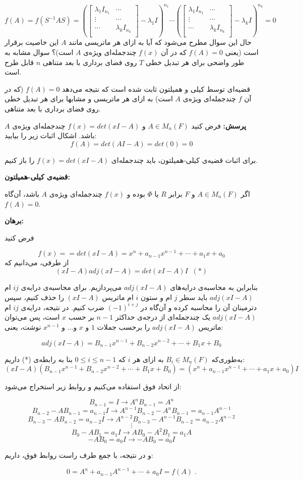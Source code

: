 $$f(A)=f(S^{-1}AS)=(\begin{bmatrix}
\lambda_1 I_{n_1} & \cdots \\
\vdots & \cdots \\
\cdots & \lambda_k I_{n_k}\\
\end{bmatrix}-\lambda_1 I)^{n_1} \cdots (\begin{bmatrix}
\lambda_1 I_{n_1} & \cdots \\
\vdots & \cdots \\
\cdots & \lambda_k I_{n_k}\\
\end{bmatrix}-\lambda_k I)^{n_k}=0 $$
حال این سوال مطرح می‌شود که آیا به ازای هر ماتریسی مانند $A$ این خاصیت برقرار است (یعنی $f(A)=0$ که در آن $f(x)$ چندجمله‌ای ویژه‌ی $A$ است)؟ سوال مشابه به طور واضحی برای هر تبدیل خطی $T$ روی فضای برداری با بعد متناهی $n$ قابل طرح است.

قضیه‌ای توسط کیلی و همیلتون ثابت شده است که نتیجه می‌دهد $f(A)=0$ (که در آن $f$ چندجمله‌ای ویژه‌ی $A$ است) به ازای هر ماتریسی و مشابها برای هر تبدیل خطی روی فضای برداری با بعد متناهی.

\textbf{پرسش:}
فرض کنید $A\in M_n(F)$ و 
$f(x)=det(xI-A)$
چندجمله‌ای ویژه‌ی $A$ باشد. اشکال اثبات زیر را بیابید:
$$f(A)=det(AI-A)=det(0)=0$$

برای اثبات قضیه‌ی کیلی-همیلتون، باید چندجمله‌ای $f(x)=det(xI-A)$ را باز کنیم.

\textbf{قضیه‌ی کیلی-همیلتون:}

اگر $A\in M_n(F)$ و $F$ برابر $R$ یا $\Phi$ بوده و $f(x)$ چندجمله‌ای ویژه‌ی $A$ باشد، آن‌گاه $f(A)=0$.

\textbf{برهان:}

فرض کنید

$$f(x) = =det(xI-A)=x^n+a_{n-1}x^{n-1}+\cdots+a_1x + a_0$$
از طرفی، می‌دانیم که
$$(xI-A)adj(xI-A) = det(xI-A)I \; \; (*)$$

بنابراین به محاسبه‌ی درایه‌های $adj(xI-A)$ می‌پردازیم. برای محاسبه‌ی درایه‌ی $ij$ ام $adj(xI-A)$ باید سطر $j$ ام و ستون $i$ ام ماتریس $(xI-A)$ را حذف کنیم، سپس دترمینان آن را محاسبه کرده و آن‌گاه در
$(-1)^{i+j}$
ضرب کنیم. در نتیجه، درایه‌ی $ij$ ام $adj(xI-A)$ یک چندجمله‌ای از درجه‌ی حداکثر $n-1$ بر حسب $x$ است، پس می‌توان ماتریس $adj(xI-A)$ را برحسب جملات $1$ و $x$ و... و $x^{n-1}$ نوشت، یعنی:

$$adj(xI-A)=B_{n-1}x^{n-1}+B_{n-2}x^{n-2}+\cdots+B_1x+B_0$$

به‌طوری‌که $B_i\in M_n(F)$ به ازای هر $i$ که
$0\leq i \leq n-1$
بنا به رابطه‌ی (*) داریم:
$$(xI-A)(B_{n-1}x^{n-1}+B_{n-2}x^{n-2}+\cdots+B_1x+B_0)=(x^n+a_{n-1}x^{n-1}+\cdots+a_1x + a_0)I$$

از اتحاد فوق استفاده می‌کنیم و روابط زیر استخراج می‌شود:

$$ B_{n-1}=I \to A^nB_{n-1} = A^n $$
$$ B_{n-2}-AB_{n-1}=a_{n-1}I \to A^{n-1}B_{n-2}- A^nB_{n-1} = a_{n-1}A^{n-1} $$
$$ B_{n-3}-AB_{n-2}=a_{n-2}I \to A^{n-2}B_{n-3}- A^{n-1}B_{n-2} = a_{n-2}A^{n-2} $$
$$ \vdots $$
$$ B_{0}-AB_{1}=a_{1}I \to AB_{0}- A^{2}B_{1} = a_{1}A $$
$$ -AB_0 = a_0I \to -AB_0=a_0I$$

و در نتیجه، با جمع طرف راست روابط فوق، داریم:

$$0=A^n + a_{n-1}A^{n-1}+\cdots + a_0I = f(A) \; .$$


